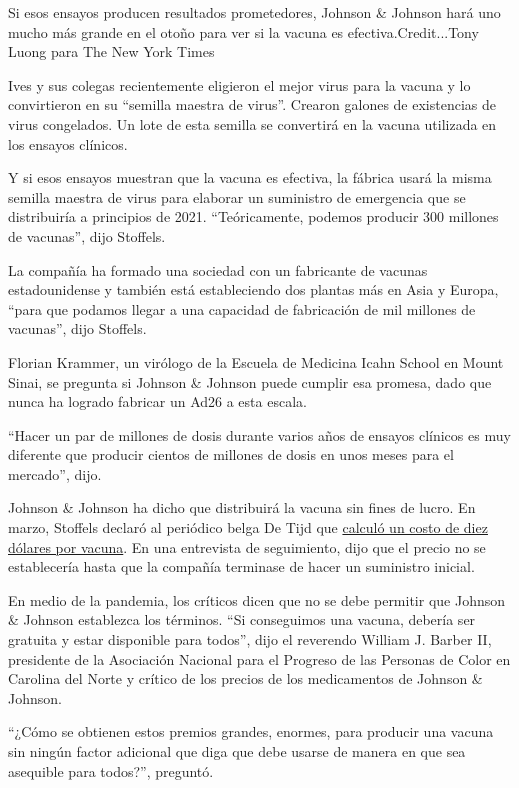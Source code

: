 Si esos ensayos producen resultados prometedores, Johnson \& Johnson
hará uno mucho más grande en el otoño para ver si la vacuna es
efectiva.Credit...Tony Luong para The New York Times

Ives y sus colegas recientemente eligieron el mejor virus para la vacuna
y lo convirtieron en su ``semilla maestra de virus''. Crearon galones de
existencias de virus congelados. Un lote de esta semilla se convertirá
en la vacuna utilizada en los ensayos clínicos.

Y si esos ensayos muestran que la vacuna es efectiva, la fábrica usará
la misma semilla maestra de virus para elaborar un suministro de
emergencia que se distribuiría a principios de 2021. ``Teóricamente,
podemos producir 300 millones de vacunas'', dijo Stoffels.

La compañía ha formado una sociedad con un fabricante de vacunas
estadounidense y también está estableciendo dos plantas más en Asia y
Europa, ``para que podamos llegar a una capacidad de fabricación de mil
millones de vacunas'', dijo Stoffels.

Florian Krammer, un virólogo de la Escuela de Medicina Icahn School en
Mount Sinai, se pregunta si Johnson \& Johnson puede cumplir esa
promesa, dado que nunca ha logrado fabricar un Ad26 a esta escala.

``Hacer un par de millones de dosis durante varios años de ensayos
clínicos es muy diferente que producir cientos de millones de dosis en
unos meses para el mercado'', dijo.

Johnson \& Johnson ha dicho que distribuirá la vacuna sin fines de
lucro. En marzo, Stoffels declaró al periódico belga De Tijd que
\href{https://www.tijd.be/ondernemen/farma-biotech/we-rekenen-op-een-vaccin-van-10-euro-tegen-coronavirus/10217795.html}{calculó
un costo de diez dólares por vacuna}. En una entrevista de seguimiento,
dijo que el precio no se establecería hasta que la compañía terminase de
hacer un suministro inicial.

En medio de la pandemia, los críticos dicen que no se debe permitir que
Johnson \& Johnson establezca los términos. ``Si conseguimos una vacuna,
debería ser gratuita y estar disponible para todos'', dijo el reverendo
William J. Barber II, presidente de la Asociación Nacional para el
Progreso de las Personas de Color en Carolina del Norte y crítico de los
precios de los medicamentos de Johnson \& Johnson.

``¿Cómo se obtienen estos premios grandes, enormes, para producir una
vacuna sin ningún factor adicional que diga que debe usarse de manera en
que sea asequible para todos?'', preguntó.

